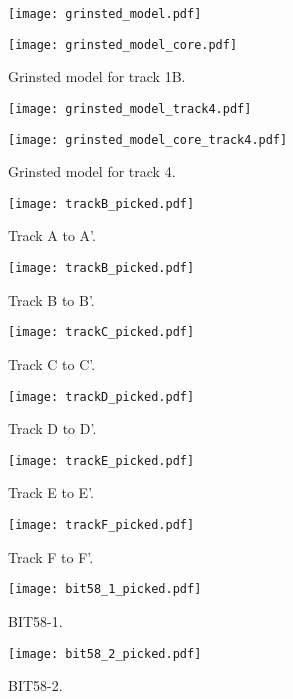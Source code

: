 \documentclass[11pt, oneside]{article}   	%
\begin{document}


\begin{figure}
	\centerline{\texttt{[image: grinsted\_model.pdf]}}
	\centerline{\texttt{[image: grinsted\_model\_core.pdf]}}
	\caption{Grinsted model for track 1B.}
\end{figure}

\begin{figure}
	\centerline{\texttt{[image: grinsted\_model\_track4.pdf]}}
	\centerline{\texttt{[image: grinsted\_model\_core\_track4.pdf]}}
	\caption{Grinsted model for track 4.}
\end{figure}

\begin{figure}
	\centerline{\texttt{[image: trackB\_picked.pdf]}}
	\caption{Track A to A'.}
\end{figure}

\begin{figure}
	\centerline{\texttt{[image: trackB\_picked.pdf]}}
	\caption{Track B to B'.}
\end{figure}

\begin{figure}
	\centerline{\texttt{[image: trackC\_picked.pdf]}}
	\caption{Track C to C'.}
\end{figure}

\begin{figure}
	\centerline{\texttt{[image: trackD\_picked.pdf]}}
	\caption{Track D to D'.}
\end{figure}

\begin{figure}
	\centerline{\texttt{[image: trackE\_picked.pdf]}}
	\caption{Track E to E'.}
\end{figure}

\begin{figure}
	\centerline{\texttt{[image: trackF\_picked.pdf]}}
	\caption{Track F to F'.}
\end{figure}

\begin{figure}
	\centerline{\texttt{[image: bit58\_1\_picked.pdf]}}
	\caption{BIT58-1.}
\end{figure}

\begin{figure}
	\centerline{\texttt{[image: bit58\_2\_picked.pdf]}}
	\caption{BIT58-2.}
\end{figure}
\end{document}
